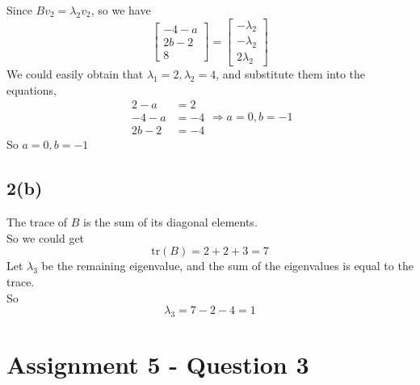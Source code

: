 \documentclass{article}
\begin{document}
Since $B v_2 = \lambda_2 v_2 $, so we have
$$
\begin{bmatrix}
    -4 - a \\ 2b - 2 \\ 8
\end{bmatrix} = 
\begin{bmatrix}
    -\lambda_2 \\ -\lambda_2 \\ 2\lambda_2
\end{bmatrix}
$$
We could easily obtain that $\lambda_1 = 2, \lambda_2 = 4$, and substitute them into the equations,
$$
\begin{aligned}
    2 - a &= 2 \\
    -4 - a &= -4 \\
    2b - 2 &= -4
\end{aligned}
\Rightarrow a = 0, b = -1
$$
So $a = 0, b = -1$
\subsection*{2(b)}
The trace of $B$ is the sum of its diagonal elements. \\
So we could get
$$
\text{tr}(B) = 2 + 2 + 3 = 7
$$
Let $\lambda_3$ be the remaining eigenvalue, and the sum of the eigenvalues is equal to the trace.\\
So 
$$
\lambda_3 = 7 - 2 - 4 = 1
$$
\section*{Assignment 5 - Question 3}
\end{document}
